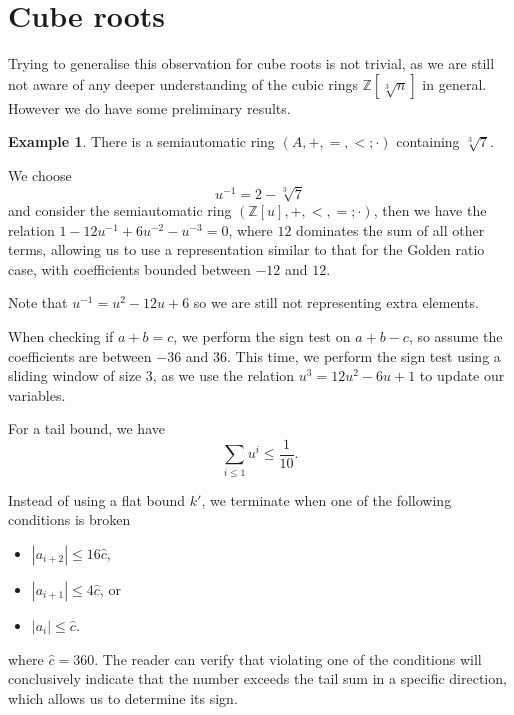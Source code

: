 \documentclass[british,a4paper,11pt,abstract=on]{scrreprt}
\theoremstyle{definition}
\newtheorem{example}[theorem]{Example}
\theoremstyle{remark}
\newcommand{\abs}[1]{\left\lvert #1 \right\rvert}
\newcommand{\Z}{\mathbb{Z}}
\newcommand{\cbrt}[1]{\sqrt[3]{#1}}
\begin{document}
\section{Cube roots}

Trying to generalise this observation for cube roots is not trivial,
as we are still not aware of any deeper understanding of the cubic rings \(\Z[\sqrt[3]{n}]\) in general.
However we do have some preliminary results.

\begin{example} \label{cube root 7}
    There is a semiautomatic ring \((A, +, =, <;\cdot)\) containing \(\cbrt{7}\).

    We choose \[ u^{-1} = 2 - \cbrt{7} \]
    and consider the semiautomatic ring \((\Z[u], +, <, =;\cdot)\),
    then we have the relation \(1 - 12u^{-1} + 6u^{-2} - u^{-3} = 0\), where \(12\) dominates the sum of all other terms,
    allowing us to use a representation similar to that for the Golden ratio case, with coefficients bounded between \(-12\) and \(12\).

    Note that \(u^{-1} = u^2 - 12u + 6\) so we are still not representing extra elements.

    When checking if \(a + b = c\), we perform the sign test on \(a + b - c\), so assume the coefficients are between \(-36\) and \(36\).
    This time, we perform the sign test using a sliding window of size \(3\), as we use the relation \(u^3 = 12u^2 - 6u + 1\) to update our variables.

    For a tail bound, we have \[\sum_{i\leq 1} u^i \leq \frac1{10}.\]

    Instead of using a flat bound \(k'\), we terminate when one of the following conditions is broken
    \begin{itemize}
        \item \(\abs{a_{i+2}} \leq 16\hat{c}\),
        \item \(\abs{a_{i+1}} \leq 4\hat{c}\), or
        \item \(\abs{a_{i}} \leq \hat{c}\).
    \end{itemize}
    where \(\hat{c} = 360\).
    The reader can verify that violating one of the conditions will conclusively indicate that the number exceeds the tail sum in a specific direction, which allows us to determine its sign.
\end{example}
\end{document}

